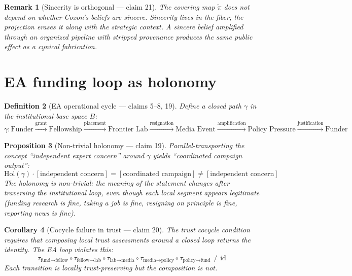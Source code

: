 \documentclass[11pt,a4paper]{article}
\newtheorem{definition}{Definition}[section]
\newtheorem{proposition}[definition]{Proposition}
\newtheorem{corollary}[definition]{Corollary}
\newtheorem{remark}[definition]{Remark}
\begin{document}
\begin{remark}[Sincerity is orthogonal --- claim 21]
The covering map $\tilde{\pi}$ does not depend on whether Coxon's beliefs are
sincere. Sincerity lives in the fiber; the projection erases it along with
the strategic context. A sincere belief amplified through an organized
pipeline with stripped provenance produces the same public effect as a
cynical fabrication.
\end{remark}

\section{EA funding loop as holonomy}
\label{sec:holonomy}

\begin{definition}[EA operational cycle --- claims 5--8, 19]
\label{def:ea-cycle}
Define a closed path $\gamma$ in the institutional base space $B$:
\[
  \gamma : \text{Funder} \xrightarrow{\text{grant}}
           \text{Fellowship} \xrightarrow{\text{placement}}
           \text{Frontier Lab} \xrightarrow{\text{resignation}}
           \text{Media Event} \xrightarrow{\text{amplification}}
           \text{Policy Pressure} \xrightarrow{\text{justification}}
           \text{Funder}
\]
\end{definition}

\begin{proposition}[Non-trivial holonomy --- claim 19]
\label{prop:holonomy}
Parallel-transporting the concept ``independent expert concern'' around
$\gamma$ yields ``coordinated campaign output'':
\[
  \mathrm{Hol}(\gamma) \cdot [\text{independent concern}]
  = [\text{coordinated campaign}] \neq [\text{independent concern}]
\]
The holonomy is non-trivial: the meaning of the statement changes after
traversing the institutional loop, even though each local segment appears
legitimate (funding research is fine, taking a job is fine, resigning on
principle is fine, reporting news is fine).
\end{proposition}

\begin{corollary}[Cocycle failure in trust --- claim 20]
The trust cocycle condition requires that composing local trust assessments
around a closed loop returns the identity. The EA loop violates this:
\[
  \tau_{\text{fund}\to\text{fellow}} \circ \tau_{\text{fellow}\to\text{lab}}
  \circ \tau_{\text{lab}\to\text{media}} \circ \tau_{\text{media}\to\text{policy}}
  \circ \tau_{\text{policy}\to\text{fund}} \neq \mathrm{id}
\]
Each transition is locally trust-preserving but the composition is not.
\end{corollary}
\end{document}
